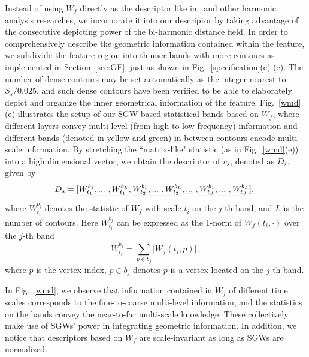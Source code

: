 Instead of using $W_f$ directly as the descriptor like
in~\cite{Li:2013} and other harmonic analysis researches, we
incorporate it into our descriptor by taking advantage of the
consecutive depicting power of the bi-harmonic distance field. In
order to comprehensively describe the geometric information contained
within the feature, we subdivide the feature region into thinner bands
with more contours as implemented in Section~\ref{sec:GF}, just as
shown in Fig.~\ref{specification}(c)-(e). The number of dense contours
may be set automatically as the integer nearest to $S_{s}/0.025$, and
such dense contours have been verified to be able to elaborately
depict and organize the inner geometrical information of the feature.
Fig.~\ref{wmd}(e) illustrates the setup of our SGW-based statistical
bands based on $W_f$, where different layers convey multi-level (from
high to low frequency) information and different bands (denoted in
yellow and green) in-between contours encode multi-scale information.
By stretching the ``matrix-like" statistic (as in Fig.~\ref{wmd}(e))
into a high dimensional vector, we obtain the descriptor of $v_s$,
denoted as $D_s$, given by
\begin{equation}
\label{eq:Des}
\hspace{-1.2mm}
D_s=[\underline{W_{t_1}^{b_1},...\ ,W_{t_1}^{b_L}},\\
\underline{W_{t_2}^{b_1},...\ ,W_{t_2}^{b_L}},\\
\underline{...}\ , \\
\underline{W_{t_J}^{b_1},...\ ,W_{t_J}^{b_L}}],
\end{equation}
where $W_{t_i}^{b_j}$ denotes the statistic of $W_f$ with scale $t_i$
on the $j$-th band, and $L$ is the number of contours. Here
$W_{t_i}^{b_j}$ can be expressed as the 1-norm of $W_f(t_i, \cdot)$
over the $j$-th band
\begin{equation}
\label{eq:WMD_sta}
W_{t_i}^{b_j} = \sum_{p \in b_j}| W_f(t_i,p)|,
\end{equation}
where $p$ is the vertex index, $p \in b_j$ denotes $p$ is a vertex
located on the $j$-th band.

In Fig.~\ref{wmd}, we observe that information contained in $W_f$ of
different time scales corresponds to the fine-to-coarse multi-level
information, and the statistics on the bands convey the near-to-far
multi-scale knowledge. These collectively make use of SGWs' power in
integrating geometric information. In addition, we notice that
descriptors based on $W_f$ are scale-invariant as long as SGWs are
normalized.

